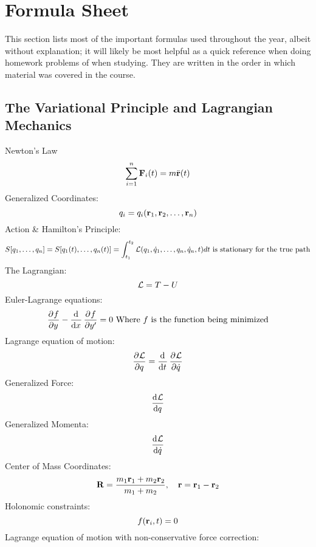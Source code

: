 \section{Formula Sheet}
This section lists most of the important formulas used throughout the year, albeit without explanation; it will likely be most helpful as a quick reference when doing homework problems of when studying. They are written in the order in which material was covered in the course. 
\subsection{The Variational Principle and Lagrangian Mechanics}
Newton's Law
\begin{equation}
    \sum_{i=1}^{n}\mathbf{F}_i(t) = m\ddot{\mathbf{r}}(t)
\end{equation}
Generalized Coordinates:
\begin{equation}
q_i = q_i(\mathbf{r}_1, \mathbf{r}_2, \ldots, \mathbf{r}_n)
\end{equation}
Action \& Hamilton's Principle:
\begin{equation}
    S[q_1, \ldots, q_n] = S[q_1(t), \ldots, q_n(t)] = \int_{t_1}^{t_2}\mathcal{L}(q_1, \dot{q}_1,\ldots, q_n, \dot{q}_n, t)dt \text{ is stationary for the true path}
\end{equation}
The Lagrangian:
\begin{equation}
    \mathcal{L} = T - U
\end{equation}
Euler-Lagrange equations:
\begin{equation}
    \dpd{f}{y} - \dod{}{x}\dpd{f}{y'} = 0 \text{ Where $f$ is the function being minimized}
\end{equation}
Lagrange equation of motion:
\begin{equation}
    \dpd{\LL}{q} = \dod{}{t}\dpd{\LL}{\dot{q}}
\end{equation}
Generalized Force:
\begin{equation}
    \dod{\LL}{q}
\end{equation}
Generalized Momenta:
\begin{equation}
    \dod{\LL}{\dot{q}}
\end{equation}
Center of Mass Coordinates:
\begin{equation}
    \mathbf{R} = \frac{m_1\mathbf{r}_1 + m_2\mathbf{r}_2}{m_1 + m_2}, \quad \mathbf{r} = \mathbf{r}_1 - \mathbf{r}_2
\end{equation}
Holonomic constraints:
\begin{equation}
    f(\mathbf{r}_i, t) = 0
\end{equation}
Lagrange equation of motion with non-conservative force correction:
